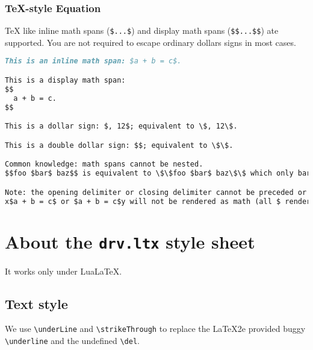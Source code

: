\subsection{TeX-style Equation}
TeX like inline math spans (\verb!$...$!) and display math spans (\verb!$$...$$!) ate supported. You are not required to escape ordinary dollars signs in most cases.\par
\begin{lstlisting}[language=Markdown]
This is an inline math span: $a + b = c$.

This is a display math span:
$$
  a + b = c.
$$

This is a dollar sign: $, 12$; equivalent to \$, 12\$.

This is a double dollar sign: $$; equivalent to \$\$.

Common knowledge: math spans cannot be nested.
$$foo $bar$ baz$$ is equivalent to \$\$foo $bar$ baz\$\$ which only bar is rendered as equation.

Note: the opening delimiter or closing delimiter cannot be preceded or followed by an alphanumeric character.
x$a + b = c$ or $a + b = c$y will not be rendered as math (all $ rendered as \$)
\end{lstlisting}
\chapter{About the \texttt{drv.ltx} style sheet}
It works only under LuaLaTeX.\par
\section{Text style}
We use \verb!\underLine! and \verb!\strikeThrough! to replace the LaTeX2e provided buggy \verb!\underline! and the undefined \verb!\del!.\par

